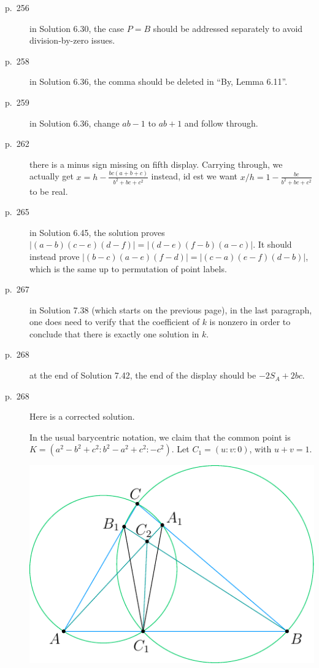 \documentclass[11pt]{scrartcl}
\begin{document}
\begin{description}
\item[p.\  256] in Solution 6.30, the case $P=B$ should be addressed separately
  to avoid division-by-zero issues.
\item[p.\  258] in Solution 6.36, the comma should be deleted in ``By, Lemma 6.11''.
\item[p.\  259] in Solution 6.36, change $ab-1$ to $ab+1$ and follow through.
\item[p.\  262] there is a minus sign missing on fifth display.
  Carrying through, we actually get $x = h - \frac{bc(a+b+c)}{b^2+bc+c^2}$ instead,
  id est we want $x/h = 1 - \frac{bc}{b^2+bc+c^2}$ to be real.
\item[p.\  265] in Solution 6.45, the solution proves $|(a-b)(c-e)(d-f)|=|(d-e)(f-b)(a-c)|$.
  It should instead prove $|(b-c)(a-e)(f-d)|=|(c-a)(e-f)(d-b)|$,
  which is the same up to permutation of point labels.
\item[p.\ 267] in Solution 7.38 (which starts on the previous page),
  in the last paragraph, one does need to verify that the coefficient of $k$ is nonzero
  in order to conclude that there is exactly one solution in $k$.
\item[p.\  268] at the end of Solution 7.42, the end of the display should be $-2S_A+2bc$.
\item[p.\  268] 
  Here is a corrected solution.

  In the usual barycentric notation,
  we claim that the common point is $K = \left( a^2-b^2+c^2 : b^2-a^2+c^2 : -c^2 \right)$.
  Let $C_1 = (u:v:0)$, with $u+v=1$.
  \begin{center}
    \includegraphics{sharygin-figure.pdf}
  \end{center}


\end{description}
\end{document}
